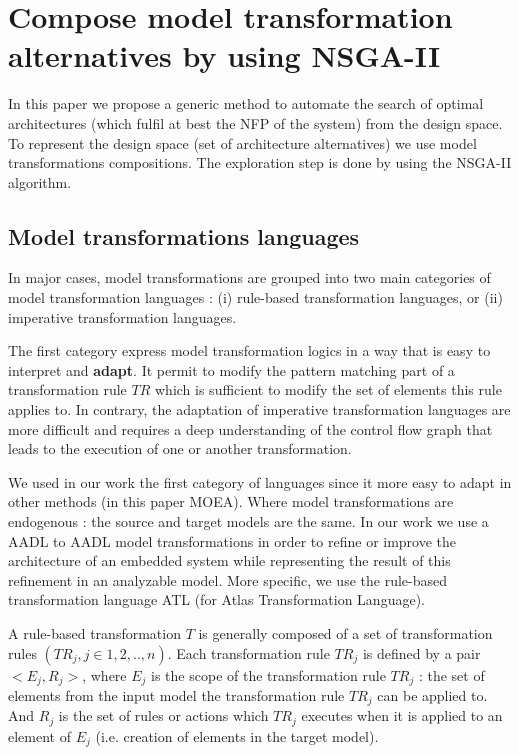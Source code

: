 \documentclass[conference]{IEEEtran}
\begin{document}
\section{Compose model transformation alternatives by using NSGA-II}
\label{Adapting}

In this paper we propose a generic method to automate the search of optimal architectures (which fulfil at best the NFP of the system) from the design space. To represent the design space (set of architecture alternatives) we use model transformations compositions. The exploration step is done by using the NSGA-II algorithm.

\subsection{Model transformations languages}
In major cases, model transformations are grouped into two main categories of model transformation languages : (i) rule-based transformation languages, or (ii) imperative transformation languages\cite{Gorp06integratinga}.

The first category express model transformation logics in a way that is easy to interpret and \textbf{adapt}. It permit to modify the pattern matching part of a transformation rule $TR$ which is sufficient to modify the set of elements this rule applies to. In contrary, the adaptation of imperative transformation languages are more difficult and requires a deep understanding of the control flow graph that leads to the execution of one or another transformation.

We used in our work the first category of languages since it more easy to adapt in other methods (in this paper MOEA). Where model transformations are endogenous : the source and target models are the same. In our work we use a AADL to AADL model transformations in order to refine or improve the architecture of an embedded system while representing the result of this refinement in an analyzable model. More specific, we use the rule-based transformation language ATL (for Atlas Transformation Language).

A rule-based transformation $T$ is generally composed of a set of transformation rules $(TR_{j}, j \in {1,2,..,n})$. Each transformation rule $TR_{j}$ is defined by a pair $<E_{j},R_{j}>$, where $E_{j}$ is the scope of the transformation rule $TR_{j}$ : the set of elements from the input model the transformation rule $TR_{j}$ can be applied to. And $R_{j}$ is the set of rules or actions which $TR_{j}$ executes when it is applied to an element of $E_{j}$ (i.e. creation of elements in the target model).
\end{document}
